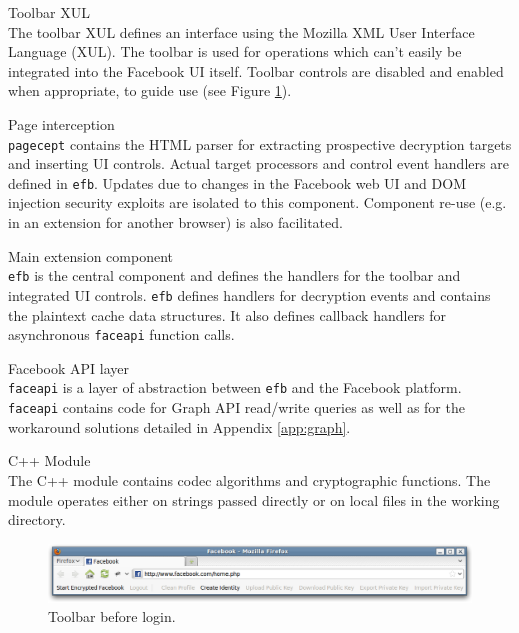     \begin{sdesc}
     
    \item[Toolbar XUL] \hfill \\ The toolbar XUL defines an interface using the Mozilla XML User Interface Language (XUL). The toolbar is used for operations which can't easily be integrated into the Facebook UI itself. Toolbar controls are disabled and enabled when appropriate, to guide use (see Figure \ref{scn:toolbar}).
    
    \item[Page interception] \hfill \\ {\tt pagecept} contains the HTML parser for extracting prospective decryption targets and inserting UI controls. Actual target processors and control event handlers are defined in {\tt efb}. Updates due to changes in the Facebook web UI and DOM injection security exploits are isolated to this component. Component re-use (e.g. in an extension for another browser) is also facilitated. 

    \item[Main extension component] \hfill \\ {\tt efb} is the central component and defines the handlers for the toolbar and integrated UI controls. {\tt efb} defines handlers for decryption events and contains the plaintext cache data structures. It also defines callback handlers for asynchronous {\tt faceapi} function calls.
    
    \item[Facebook API layer] \hfill \\ {\tt faceapi} is a layer of abstraction between {\tt efb} and the Facebook platform. {\tt faceapi} contains code for Graph API read/write queries as well as for the workaround solutions detailed in Appendix \ref{app:graph}.

    \item[C++ Module] \hfill \\ The C++ module contains codec algorithms and cryptographic functions. The module operates either on strings passed directly or on local files in the working directory.
    
    \end{sdesc}
    
        \begin{figure}[tbph]
        \begin{center}
                \includegraphics[width=12cm]{screens/toolbar.png}
            \caption{Toolbar before login.}
            \label{scn:toolbar}
        \end{center}
    \end{figure}
    

